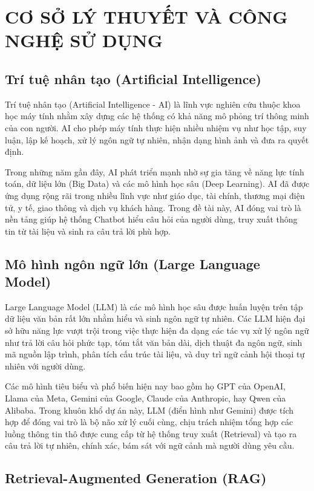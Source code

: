 \chapter{CƠ SỞ LÝ THUYẾT VÀ CÔNG NGHỆ SỬ DỤNG}
\section{Trí tuệ nhân tạo (Artificial Intelligence)}

Trí tuệ nhân tạo (Artificial Intelligence - AI) là lĩnh vực nghiên cứu thuộc khoa học máy tính nhằm xây dựng các hệ thống có khả năng mô phỏng trí thông minh của con người. AI cho phép máy tính thực hiện nhiều nhiệm vụ như học tập, suy luận, lập kế hoạch, xử lý ngôn ngữ tự nhiên, nhận dạng hình ảnh và đưa ra quyết định.

Trong những năm gần đây, AI phát triển mạnh nhờ sự gia tăng về năng lực tính toán, dữ liệu lớn (Big Data) và các mô hình học sâu (Deep Learning). AI đã được ứng dụng rộng rãi trong nhiều lĩnh vực như giáo dục, tài chính, thương mại điện tử, y tế, giao thông và dịch vụ khách hàng. Trong đề tài này, AI đóng vai trò là nền tảng giúp hệ thống Chatbot hiểu câu hỏi của người dùng, truy xuất thông tin từ tài liệu và sinh ra câu trả lời phù hợp.

\section{Mô hình ngôn ngữ lớn (Large Language Model)}

Large Language Model (LLM) là các mô hình học sâu được huấn luyện trên tập dữ liệu văn bản rất lớn nhằm hiểu và sinh ngôn ngữ tự nhiên. Các LLM hiện đại sở hữu năng lực vượt trội trong việc thực hiện đa dạng các tác vụ xử lý ngôn ngữ như trả lời câu hỏi phức tạp, tóm tắt văn bản dài, dịch thuật đa ngôn ngữ, sinh mã nguồn lập trình, phân tích cấu trúc tài liệu, và duy trì ngữ cảnh hội thoại tự nhiên với người dùng.

Các mô hình tiêu biểu và phổ biến hiện nay bao gồm họ GPT của OpenAI, Llama của Meta, Gemini của Google, Claude của Anthropic, hay Qwen của Alibaba. Trong khuôn khổ dự án này, LLM (điển hình như Gemini) được tích hợp để đóng vai trò là bộ não xử lý cuối cùng, chịu trách nhiệm tổng hợp các luồng thông tin thô được cung cấp từ hệ thống truy xuất (Retrieval) và tạo ra câu trả lời tự nhiên, chính xác, bám sát với ngữ cảnh mà người dùng yêu cầu.

\section{Retrieval-Augmented Generation (RAG)}


